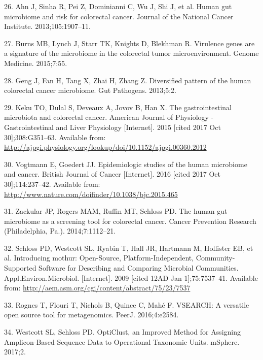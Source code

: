 \documentclass[12pt,]{article}
\begin{document}
\hypertarget{ref-ahn_human_2013}{}
26. Ahn J, Sinha R, Pei Z, Dominianni C, Wu J, Shi J, et al. Human gut
microbiome and risk for colorectal cancer. Journal of the National
Cancer Institute. 2013;105:1907--11.

\hypertarget{ref-burns_virulence_2015}{}
27. Burns MB, Lynch J, Starr TK, Knights D, Blekhman R. Virulence genes
are a signature of the microbiome in the colorectal tumor
microenvironment. Genome Medicine. 2015;7:55.

\hypertarget{ref-geng_diversified_2013}{}
28. Geng J, Fan H, Tang X, Zhai H, Zhang Z. Diversified pattern of the
human colorectal cancer microbiome. Gut Pathogens. 2013;5:2.

\hypertarget{ref-keku_gastrointestinal_2015}{}
29. Keku TO, Dulal S, Deveaux A, Jovov B, Han X. The gastrointestinal
microbiota and colorectal cancer. American Journal of Physiology -
Gastrointestinal and Liver Physiology {[}Internet{]}. 2015 {[}cited 2017
Oct 30{]};308:G351--63. Available from:
\url{http://ajpgi.physiology.org/lookup/doi/10.1152/ajpgi.00360.2012}

\hypertarget{ref-vogtmann_epidemiologic_2016}{}
30. Vogtmann E, Goedert JJ. Epidemiologic studies of the human
microbiome and cancer. British Journal of Cancer {[}Internet{]}. 2016
{[}cited 2017 Oct 30{]};114:237--42. Available from:
\url{http://www.nature.com/doifinder/10.1038/bjc.2015.465}

\hypertarget{ref-zackular_human_2014}{}
31. Zackular JP, Rogers MAM, Ruffin MT, Schloss PD. The human gut
microbiome as a screening tool for colorectal cancer. Cancer Prevention
Research (Philadelphia, Pa.). 2014;7:1112--21.

\hypertarget{ref-schloss_introducing_2009}{}
32. Schloss PD, Westcott SL, Ryabin T, Hall JR, Hartmann M, Hollister
EB, et al. Introducing mothur: Open-Source, Platform-Independent,
Community-Supported Software for Describing and Comparing Microbial
Communities. Appl.Environ.Microbiol. {[}Internet{]}. 2009 {[}cited 12AD
Jan 1{]};75:7537--41. Available from:
\url{http://aem.asm.org/cgi/content/abstract/75/23/7537}

\hypertarget{ref-rognes_vsearch_2016}{}
33. Rognes T, Flouri T, Nichols B, Quince C, Mahé F. VSEARCH: A
versatile open source tool for metagenomics. PeerJ. 2016;4:e2584.

\hypertarget{ref-westcott_opticlust_2017}{}
34. Westcott SL, Schloss PD. OptiClust, an Improved Method for Assigning
Amplicon-Based Sequence Data to Operational Taxonomic Units. mSphere.
2017;2.
\end{document}
